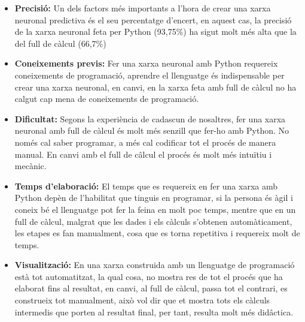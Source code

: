 \begin{itemize}

 \item \textbf{Precisió: } Un dels factors més importants a l'hora de crear una xarxa neuronal predictiva és el seu percentatge d'encert, en aquest cas, la precisió de la xarxa neuronal feta per Python (93,75\%) ha sigut molt més alta que la del full de càlcul (66,7\%)

 \item \textbf{Coneixements previs: } Fer una xarxa neuronal amb Python requereix coneixements de programació, aprendre el llenguatge és indispensable per crear una xarxa neuronal, en canvi, en la xarxa feta amb full de càlcul no ha calgut cap mena de coneixements de programació.

  \item \textbf{Dificultat: } Segons la experiència de cadascun de nosaltres, fer una xarxa neuronal amb full de càlcul és molt més senzill que fer-ho amb Python. No només cal saber programar, a més cal codificar tot el procés de manera manual. En canvi amb el full de câlcul el procés és molt més intuïtiu i mecànic.

  \item \textbf{Temps d'elaboració: } El temps que es requereix en fer una xarxa amb Python depèn de l'habilitat que tinguis en programar, si la persona és àgil i coneix bé el llenguatge pot fer la feina en molt poc temps, mentre que en un full de càlcul, malgrat que les dades i els càlculs s'obtenen automàticament, les etapes es fan manualment, cosa que es torna repetitiva i requereix molt de temps.

  \item \textbf{Visualització: } En una xarxa construida amb un llenguatge de programació està tot automatitzat, la qual cosa, no mostra res de tot el procés que ha elaborat fins al resultat, en canvi, al full de càlcul, passa tot el contrari, es construeix tot manualment, això vol dir que et mostra tots els càlculs intermedis que porten al resultat final, per tant, resulta molt més didâctica.

\end{itemize}

